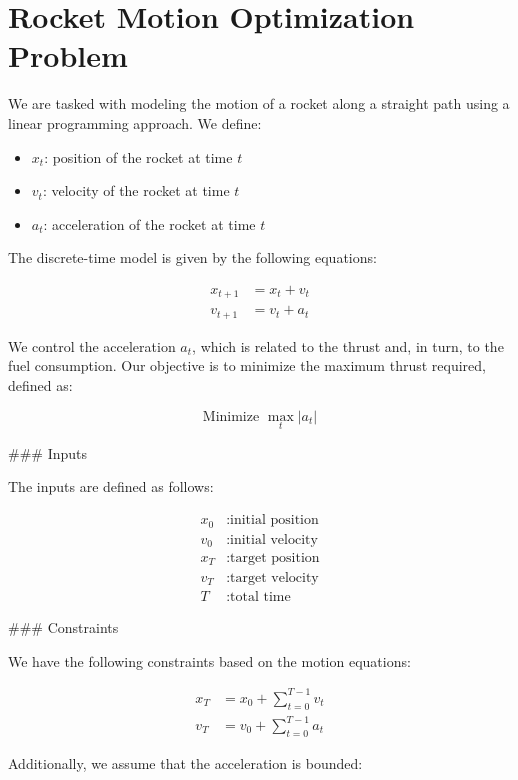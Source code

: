 \documentclass{article}
\begin{document}
\section*{Rocket Motion Optimization Problem}

We are tasked with modeling the motion of a rocket along a straight path using a linear programming approach. We define:

\begin{itemize}
    \item \( x_t \): position of the rocket at time \( t \)
    \item \( v_t \): velocity of the rocket at time \( t \)
    \item \( a_t \): acceleration of the rocket at time \( t \)
\end{itemize}

The discrete-time model is given by the following equations:

\begin{align}
    x_{t+1} &= x_t + v_t \\
    v_{t+1} &= v_t + a_t
\end{align}

We control the acceleration \( a_t \), which is related to the thrust and, in turn, to the fuel consumption. Our objective is to minimize the maximum thrust required, defined as:

\[
\text{Minimize } \max_{t} |a_t|
\]

### Inputs

The inputs are defined as follows:

\begin{align*}
    x_0 & : \text{initial position} \\
    v_0 & : \text{initial velocity} \\
    x_T & : \text{target position} \\
    v_T & : \text{target velocity} \\
    T & : \text{total time}
\end{align*}

### Constraints

We have the following constraints based on the motion equations:

\begin{align}
    x_T &= x_0 + \sum_{t=0}^{T-1} v_t \\
    v_T &= v_0 + \sum_{t=0}^{T-1} a_t
\end{align}

Additionally, we assume that the acceleration is bounded:
\end{document}
